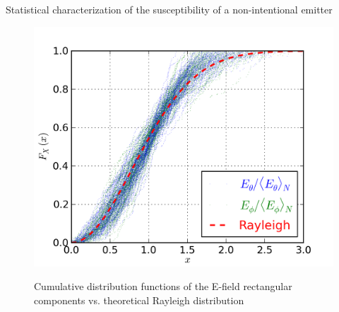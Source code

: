 \documentclass[final,hyperref={pdfpagelabels=false}]{beamer}
\begin{document}
\begin{frame}{}
\begin{columns}[t]
\begin{column}{0.32\linewidth}
\begin{block}{{Statistical characterization of the susceptibility of a non-intentional emitter}}
\begin{figure}
{          \label{fig_2G}
   	  \includegraphics[trim=20 20 20 10,width=0.44\columnwidth]{./img/CDF_ka_2_n_4.png}}\\
\vspace{-0.3cm}
    \large{\caption{Cumulative distribution functions of the E-field rectangular components vs. theoretical Rayleigh distribution}}
     \label{fig_diagsr}
\end{figure}
\end{block}

     

    \end{column}%


\end{columns}
\end{frame}
\end{document}
